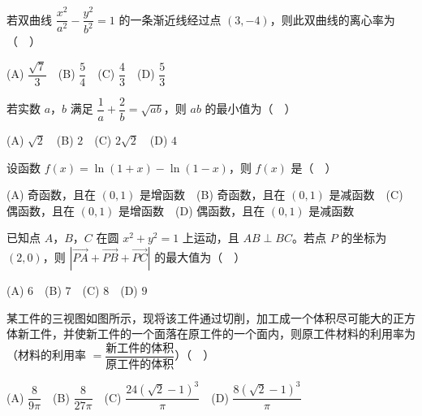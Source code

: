 \begin{question}
若双曲线 \(\dfrac{x^2}{a^2}-\dfrac{y^2}{b^2}=1\) 的一条渐近线经过点 \((3,-4)\)，则此双曲线的离心率为（　）

(A) \(\dfrac{\sqrt7}{3}\)　(B) \(\dfrac54\)　(C) \(\dfrac43\)　(D) \(\dfrac53\)

\end{question}
\begin{question}
若实数 \(a\)，\(b\) 满足 \(\dfrac1a+\dfrac2b=\sqrt{ab}\)，则 \(ab\) 的最小值为（　）

(A) \(\sqrt2\)　(B) \(2\)　(C) \(2\sqrt2\)　(D) \(4\)

\end{question}
\begin{question}
设函数 \(f(x)=\ln(1+x)-\ln(1-x)\)，则 \(f(x)\) 是（　）

(A) 奇函数，且在 \((0,1)\) 是增函数　(B) 奇函数，且在 \((0,1)\) 是减函数　(C) 偶函数，且在 \((0,1)\) 是增函数　(D) 偶函数，且在 \((0,1)\) 是减函数

\end{question}
\begin{question}
已知点 \(A\)，\(B\)，\(C\) 在圆 \(x^2+y^2=1\) 上运动，且 \(AB\perp BC\)。若点 \(P\) 的坐标为 \((2,0)\)，则 \(\left|\overrightarrow{PA}+\overrightarrow{PB}+\overrightarrow{PC}\right|\) 的最大值为（　）

(A) \(6\)　(B) \(7\)　(C) \(8\)　(D) \(9\)

\Needspace{0.4\textheight}
\end{question}
\begin{question}
某工件的三视图如图所示，现将该工件通过切削，加工成一个体积尽可能大的正方体新工件，并使新工件的一个面落在原工件的一个面内，则原工件材料的利用率为（材料的利用率 \(=\dfrac{\text{新工件的体积}}{\text{原工件的体积}}\)）（　）
\nopagebreak[4]
\begin{center}\end{center}
\nopagebreak[4]
(A) \(\dfrac{8}{9\pi}\)　(B) \(\dfrac{8}{27\pi}\)　(C) \(\dfrac{24(\sqrt2-1)^3}{\pi}\)　(D) \(\dfrac{8(\sqrt2-1)^3}{\pi}\)

\end{question}

